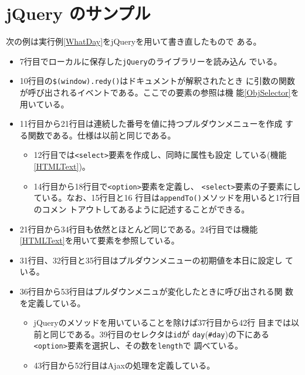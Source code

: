 \section{jQuery のサンプル}
 \begin{Exec}\upshape\label{ExjQuery}
  次の例は実行例\ref{WhatDay}をjQueryを用いて書き直したもので
 ある。
 \begin{itemize}
  \item 7行目でローカルに保存した\texttt{jQuery}のライブラリーを読み込ん
        でいる。
  \item 10行目の\texttt{\$(window).redy()}はドキュメントが解釈されたとき
	に引数の関数が呼び出されるイベントである。ここでの要素の参照は機
	能\ref{ObjSelector}を用いている。
  \item 11行目から21行目は連続した番号を値に持つプルダウンメニューを作成
	する関数である。仕様は以前と同じである。
	\begin{itemize}
	 \item 12行目では\texttt{<select>}要素を作成し、同時に属性も設定
	       している(機能\ref{HTMLText})。
	 \item 14行目から18行目で\texttt{<option>}要素を定義し、
	       \texttt{<select>}要素の子要素にしている。なお、15行目と16
	       行目は\texttt{appendTo()}メソッドを用いると17行目のコメン
	       トアウトしてあるように記述することができる。
	\end{itemize}
  \item 21行目から34行目も依然とほとんど同じである。24行目では機能
	\ref{HTMLText}を用いて要素を参照している。
  \item 31行目、32行目と35行目はプルダウンメニューの初期値を本日に設定し
	ている。
  \item 36行目から53行目はプルダウンメニュが変化したときに呼び出される関
	数を定義している。
	\begin{itemize}
	 \item jQueryのメソッドを用いていることを除けば37行目から42行
	       目までは以前と同じである。39行目のセレクタは\texttt{id}が
	       \texttt{day}(\texttt{\#day})の下にある
	       \texttt{<option>}要素を選択し、その数を\texttt{length}で
	       調べている。
	 \item 43行目から52行目はAjaxの処理を定義している。

\end{itemize}
\end{itemize}
\end{Exec}
